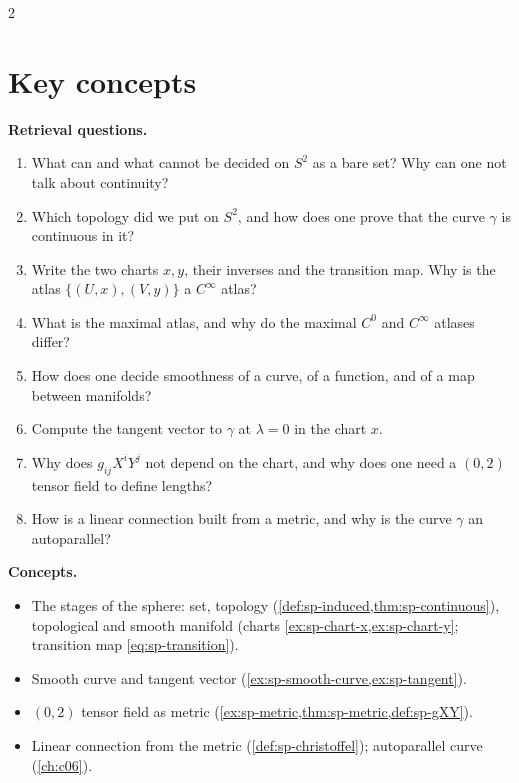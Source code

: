 \begin{paracol}{2}
\section*{Key concepts}
\begin{keyconcepts}
\textbf{Retrieval questions.}
\begin{enumerate}
  \item What can and what cannot be decided on $S^2$ as a bare set? Why can one not talk about continuity?
  \item Which topology did we put on $S^2$, and how does one prove that the curve $\gamma$ is continuous in it?
  \item Write the two charts $x,y$, their inverses and the transition map. Why is the atlas $\{(U,x),(V,y)\}$ a $C^\infty$ atlas?
  \item What is the maximal atlas, and why do the maximal $C^0$ and $C^\infty$ atlases differ?
  \item How does one decide smoothness of a curve, of a function, and of a map between manifolds?
  \item Compute the tangent vector to $\gamma$ at $\lambda=0$ in the chart $x$.
  \item Why does $g_{ij}X^iY^j$ not depend on the chart, and why does one need a $(0,2)$ tensor field to define lengths?
  \item How is a linear connection built from a metric, and why is the curve $\gamma$ an autoparallel?
\end{enumerate}
\textbf{Concepts.}
\begin{itemize}
  \item The stages of the sphere: set, topology (\cref{def:sp-induced,thm:sp-continuous}), topological and smooth manifold (charts \cref{ex:sp-chart-x,ex:sp-chart-y}; transition map \eqref{eq:sp-transition}).
  \item Smooth curve and tangent vector (\cref{ex:sp-smooth-curve,ex:sp-tangent}).
  \item $(0,2)$ tensor field as metric (\cref{ex:sp-metric,thm:sp-metric,def:sp-gXY}).
  \item Linear connection from the metric (\cref{def:sp-christoffel}); autoparallel curve (\cref{ch:c06}).
\end{itemize}
\end{keyconcepts}

\flushside
\end{paracol}
